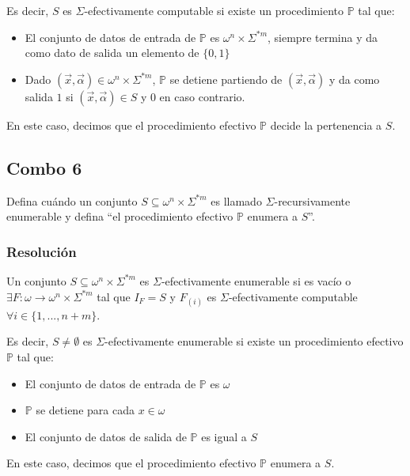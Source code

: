 \documentclass[
]{article}
\providecommand{\tightlist}{%
  \setlength{\itemsep}{0pt}\setlength{\parskip}{0pt}}
\begin{document}
Es decir, \(S\) es \(\Sigma\)-efectivamente computable si existe un
procedimiento \(\mathbb{P}\) tal que:

\begin{itemize}
\tightlist
\item
  El conjunto de datos de entrada de \(\mathbb{P}\) es
  \(\omega^n\times\Sigma^{*m}\), siempre termina y da como dato de
  salida un elemento de \(\{0,1\}\)
\item
  Dado \((\vec{x},\vec{\alpha})\in\omega^n\times\Sigma^{*m}\),
  \(\mathbb{P}\) se detiene partiendo de \((\vec{x}, \vec{\alpha})\) y
  da como salida \(1\) si \((\vec{x},\vec{\alpha})\in S\) y \(0\) en
  caso contrario.
\end{itemize}

En este caso, decimos que el procedimiento efectivo \(\mathbb{P}\)
decide la pertenencia a \(S\).

\subsection{Combo 6}\label{combo-6}

Defina cuándo un conjunto \(S\subseteq\omega^n\times\Sigma^{*m}\) es
llamado \(\Sigma\)-recursivamente enumerable y defina ``el procedimiento
efectivo \(\mathbb{P}\) enumera a \(S\)''.

\subsubsection{Resolución}\label{resoluciuxf3n-5}

Un conjunto \(S\subseteq\omega^n\times\Sigma^{*m}\) es
\(\Sigma\)-efectivamente enumerable si es vacío o
\(\exists F:\omega\to\omega^n\times\Sigma^{*m}\) tal que \(I_F=S\) y
\(F_{(i)}\) es \(\Sigma\)-efectivamente computable
\(\forall i\in\{1,...,n+m\}\).

Es decir, \(S\neq\emptyset\) es \(\Sigma\)-efectivamente enumerable si
existe un procedimiento efectivo \(\mathbb{P}\) tal que:

\begin{itemize}
\tightlist
\item
  El conjunto de datos de entrada de \(\mathbb{P}\) es \(\omega\)
\item
  \(\mathbb{P}\) se detiene para cada \(x\in\omega\)
\item
  El conjunto de datos de salida de \(\mathbb{P}\) es igual a \(S\)
\end{itemize}

En este caso, decimos que el procedimiento efectivo \(\mathbb{P}\)
enumera a \(S\).
\end{document}
